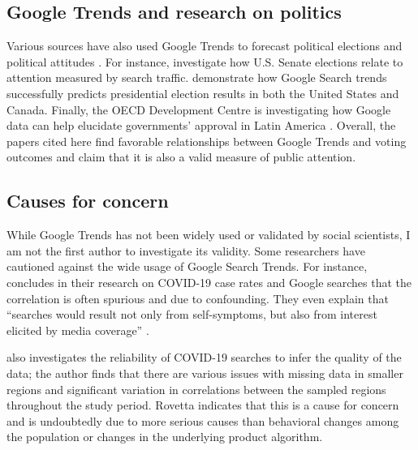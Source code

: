 \subsection{Google Trends and research on politics}

Various sources have also used Google Trends to forecast political elections and
political attitudes \citep{wolfTrendingRightDirection2018}. For instance,
\citet{swearingenGoogleInsightsSenate2014} investigate how U.S. Senate elections
relate to attention measured by search traffic.
\citet{pradoromanGoogleTrendsPredictor2020} demonstrate how Google Search trends
successfully predicts presidential election results in both the United States
and Canada. Finally, the OECD Development Centre is investigating how Google
data can help elucidate governments' approval in Latin America
\citep{montoyaUsingGoogleData2020}. Overall, the papers cited here find
favorable relationships between Google Trends and voting outcomes and claim that
it is also a valid measure of public attention.

\subsection{Causes for concern}

While Google Trends has not been widely used or validated by social scientists,
I am not the first author to investigate its validity. Some researchers have
cautioned against the wide usage of Google Search Trends. For instance,
\citet{asseoTrackingCOVID19Using2020} concludes in their research on COVID-19
case rates and Google searches that the correlation is often spurious and due to
confounding. They even explain that ``searches would result not only from
self-symptoms, but also from interest elicited by media coverage''
\citep[][p.1]{asseoTrackingCOVID19Using2020}.

\citet{rovetta21} also investigates the reliability of COVID-19 searches to
infer the quality of the data; the author finds that there are various issues
with missing data in smaller regions and significant variation in correlations
between the sampled regions throughout the study period. Rovetta indicates that
this is a cause for concern and is undoubtedly due to more serious causes than
behavioral changes among the population or changes in the underlying product
algorithm.

